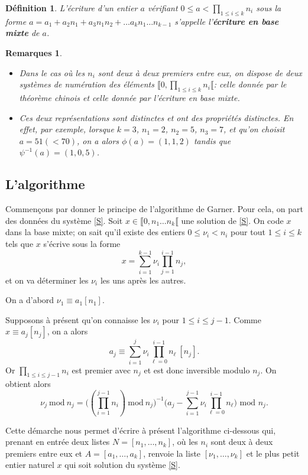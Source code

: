 \documentclass[12pt]{report}
\newtheorem*{rems}{Remarques}
\newtheorem{Def}[thm]{Définition}
\begin{document}
\begin{Def}
L'écriture d'un entier $a$ vérifiant $0 \leq a < \prod_{1 \leq i \leq k}n_i$ sous la forme $a= a_1+ a_2 n_1+ a_3 n_1 n_2+ \ldots  a_k n_1 \ldots n_{k-1}  $ s'appelle l'\textbf{écriture en base mixte} de $a$. 
\end{Def}

\begin{rems}\
\begin{itemize}
\item[•]
Dans le cas où les $n_i$ sont deux à deux premiers entre eux, on dispose de deux systèmes de numération des éléments $\llbracket 0, \prod_{1 \leq i \leq k}n_i \llbracket $: celle donnée par le théorème chinois et celle donnée par l'écriture en base mixte.
\item[•] Ces deux représentations sont distinctes et ont des propriétés distinctes. En effet, par exemple, lorsque $k=3$, $n_1=2$, $n_2=5$, $n_3=7$, et qu'on choisit $a=51 (< 70)$, on a alors $\phi(a)=(1,1,2)$  tandis que $\psi^{-1}(a)=(1,0,5)$.
\end{itemize}
\end{rems}


\subsection{L'algorithme}

Commençons par donner le principe de l'algorithme de Garner. Pour cela, on part des données du système \eqref{S}. Soit $x\in \llbracket 0,n_1\ldots n_k\llbracket$ une solution de \eqref{S}. On code $x$ dans la base mixte; on sait qu'il existe des entiers $0 \leq \nu_i < n_i $ pour tout $1 \leq i \leq k$ tels que $x$ s'écrive sous la forme
$$   x= \sum_{ i=1}^{k-1} \nu_i \prod_{ j=1}^{ i-1}n_j , $$
et on va déterminer les  $\nu_i$ les uns après les autres. \par 
On a d'abord $\nu_1 \equiv a_1 [n_1]$.\par 
Supposons à présent qu'on connaisse les $\nu_i$ pour $1 \leq i \leq j-1$. Comme $x \equiv a_j [n_j]$, on a alors
$$   a_j \equiv   \sum_{i=1}^{j} \nu_i \prod_{ \ell=0}^{i-1}n_{\ell}\   [n_j]  .   $$
Or $\prod_{1 \leq i \leq  j-1 } n_i $ est premier avec $n_j$ et est donc inversible modulo $n_j$. On obtient alors
$$     \nu_j\mathrm{\ mod\ }n_j=\Big( (\prod_{i=1}^{j-1}n_i) \mathrm{\ mod\ }n_j \Big)^{-1}  \Big( a_j-    \sum_{i=1}^{ j-1} \nu_i \prod_{\ell=0}^{i-1}n_{\ell} \Big)  \text{ mod } n_j.   $$

Cette démarche nous permet d'écrire à présent l'algorithme ci-dessous qui, prenant en entrée deux listes $N=[n_1, \ldots , n_k]$, où les $n_i$ sont deux à deux premiers entre eux et $A=[a_1,\ldots, a_k]$, renvoie la liste  $[\nu_1, \ldots, \nu_k ]$ et le plus petit entier naturel $x$ qui soit solution du système \eqref{S}.\\
\end{document}
